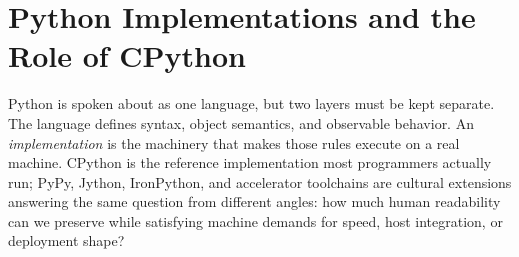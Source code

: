 \section{Python Implementations and the Role of CPython}

Python is spoken about as one language, but two layers must be kept separate. The language defines syntax, object semantics, and observable behavior. An \emph{implementation} is the machinery that makes those rules execute on a real machine. CPython is the reference implementation most programmers actually run; PyPy, Jython, IronPython, and accelerator toolchains are cultural extensions answering the same question from different angles: how much human readability can we preserve while satisfying machine demands for speed, host integration, or deployment shape?
